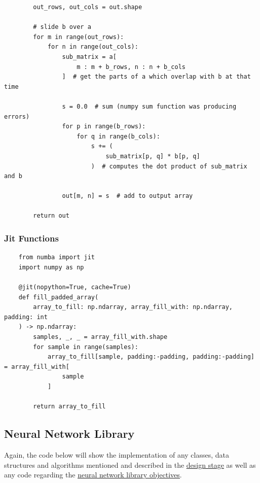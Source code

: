 \documentclass{article}
\newcommand{\myhy}[2]{\hyperref[#1]{\color{black}\setulcolor{black}\ul{#2}}}
\begin{document}
\begin{verbatim}
        out_rows, out_cols = out.shape

        # slide b over a
        for m in range(out_rows):
            for n in range(out_cols):
                sub_matrix = a[
                    m : m + b_rows, n : n + b_cols
                ]  # get the parts of a which overlap with b at that time

                s = 0.0  # sum (numpy sum function was producing errors)
                for p in range(b_rows):
                    for q in range(b_cols):
                        s += (
                            sub_matrix[p, q] * b[p, q]
                        )  # computes the dot product of sub_matrix and b

                out[m, n] = s  # add to output array

        return out
    \end{verbatim}

    \subsubsection{Jit Functions}
    \begin{verbatim}
    from numba import jit
    import numpy as np

    @jit(nopython=True, cache=True)
    def fill_padded_array(
        array_to_fill: np.ndarray, array_fill_with: np.ndarray, padding: int
    ) -> np.ndarray:
        samples, _, _ = array_fill_with.shape
        for sample in range(samples):
            array_to_fill[sample, padding:-padding, padding:-padding] = array_fill_with[
                sample
            ]

        return array_to_fill
    \end{verbatim}

    \subsection{Neural Network Library}

    Again, the code below will show the implementation of any classes, data structures and algorithms
    mentioned and described in the \myhy{NNLibDesignStage}{design stage} as well as any code regarding
    the \myhy{}{neural network library objectives}.
\end{document}

